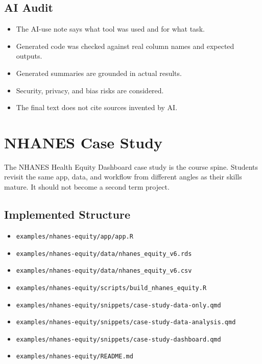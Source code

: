 \documentclass[
  letterpaper,
  DIV=11,
  numbers=noendperiod,
  oneside]{scrreprt}
\providecommand{\tightlist}{%
  \setlength{\itemsep}{0pt}\setlength{\parskip}{0pt}}
\begin{document}
\subsection*{AI Audit}\label{ai-audit}

\begin{itemize}
\tightlist
\item
  The AI-use note says what tool was used and for what task.
\item
  Generated code was checked against real column names and expected
  outputs.
\item
  Generated summaries are grounded in actual results.
\item
  Security, privacy, and bias risks are considered.
\item
  The final text does not cite sources invented by AI.
\end{itemize}

\section*{NHANES Case Study}\label{nhanes-case-study}


The NHANES Health Equity Dashboard case study is the course spine.
Students revisit the same app, data, and workflow from different angles
as their skills mature. It should not become a second term project.

\subsection*{Implemented Structure}\label{implemented-structure}

\begin{itemize}
\tightlist
\item
  \texttt{examples/nhanes-equity/app/app.R}
\item
  \texttt{examples/nhanes-equity/data/nhanes\_equity\_v6.rds}
\item
  \texttt{examples/nhanes-equity/data/nhanes\_equity\_v6.csv}
\item
  \texttt{examples/nhanes-equity/scripts/build\_nhanes\_equity.R}
\item
  \texttt{examples/nhanes-equity/snippets/case-study-data-only.qmd}
\item
  \texttt{examples/nhanes-equity/snippets/case-study-data-analysis.qmd}
\item
  \texttt{examples/nhanes-equity/snippets/case-study-dashboard.qmd}
\item
  \texttt{examples/nhanes-equity/README.md}
\end{itemize}
\end{document}
